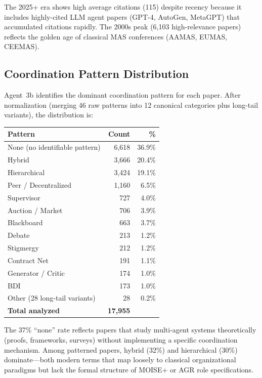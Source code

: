 \documentclass{article}
\begin{document}
\noindent
The 2025+ era shows high average citations (115) despite recency because it includes
highly-cited LLM agent papers (GPT-4, AutoGen, MetaGPT) that accumulated citations
rapidly. The 2000s peak (6,103 high-relevance papers) reflects the golden age of
classical MAS conferences (AAMAS, EUMAS, CEEMAS).

\subsection{Coordination Pattern Distribution}

Agent~3b identifies the dominant coordination pattern for each paper. After
normalization (merging 46 raw patterns into 12 canonical categories plus
long-tail variants), the distribution is:

\begin{center}
\small
\begin{tabular}{@{} l r r @{}}
\toprule
\textbf{Pattern} & \textbf{Count} & \textbf{\%} \\
\midrule
None (no identifiable pattern)  & 6,618 & 36.9\% \\
Hybrid                          & 3,666 & 20.4\% \\
Hierarchical                    & 3,424 & 19.1\% \\
Peer / Decentralized            & 1,160 & 6.5\%  \\
Supervisor                      & 727   & 4.0\%  \\
Auction / Market                & 706   & 3.9\%  \\
Blackboard                      & 663   & 3.7\%  \\
Debate                          & 213   & 1.2\%  \\
Stigmergy                       & 212   & 1.2\%  \\
Contract Net                    & 191   & 1.1\%  \\
Generator / Critic              & 174   & 1.0\%  \\
BDI                             & 173   & 1.0\%  \\
Other (28 long-tail variants)   & 28    & 0.2\%  \\
\midrule
\textbf{Total analyzed}         & \textbf{17,955} & \\
\bottomrule
\end{tabular}
\end{center}

\noindent
The 37\% ``none'' rate reflects papers that study multi-agent systems theoretically
(proofs, frameworks, surveys) without implementing a specific coordination mechanism.
Among patterned papers, hybrid (32\%) and hierarchical (30\%) dominate---both modern
terms that map loosely to classical organizational paradigms but lack the formal
structure of MOISE+ or AGR role specifications.
\end{document}
